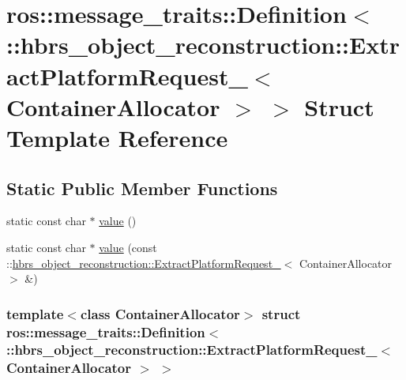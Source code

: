 \hypertarget{structros_1_1message__traits_1_1_definition_3_01_1_1hbrs__object__reconstruction_1_1_extract_pla0f9ad6b8395f266637e3e0e50d5139f9}{\section{ros\-:\-:message\-\_\-traits\-:\-:\-Definition$<$ \-:\-:hbrs\-\_\-object\-\_\-reconstruction\-:\-:\-Extract\-Platform\-Request\-\_\-$<$ \-Container\-Allocator $>$ $>$ \-Struct \-Template \-Reference}
\label{structros_1_1message__traits_1_1_definition_3_01_1_1hbrs__object__reconstruction_1_1_extract_pla0f9ad6b8395f266637e3e0e50d5139f9}
}
\subsection*{\-Static \-Public \-Member \-Functions}
\begin{DoxyCompactItemize}
\item 
static const char $\ast$ \hyperlink{structros_1_1message__traits_1_1_definition_3_01_1_1hbrs__object__reconstruction_1_1_extract_pla0f9ad6b8395f266637e3e0e50d5139f9_a8de6f844af40a3b9c6222ba32265f602}{value} ()
\item 
static const char $\ast$ \hyperlink{structros_1_1message__traits_1_1_definition_3_01_1_1hbrs__object__reconstruction_1_1_extract_pla0f9ad6b8395f266637e3e0e50d5139f9_aff5a5e769ae4d487bdc323594eff5135}{value} (const \-::\hyperlink{structhbrs__object__reconstruction_1_1_extract_platform_request__}{hbrs\-\_\-object\-\_\-reconstruction\-::\-Extract\-Platform\-Request\-\_\-}$<$ \-Container\-Allocator $>$ \&)
\end{DoxyCompactItemize}
\subsubsection*{template$<$class Container\-Allocator$>$ struct ros\-::message\-\_\-traits\-::\-Definition$<$ \-::hbrs\-\_\-object\-\_\-reconstruction\-::\-Extract\-Platform\-Request\-\_\-$<$ Container\-Allocator $>$ $>$}



